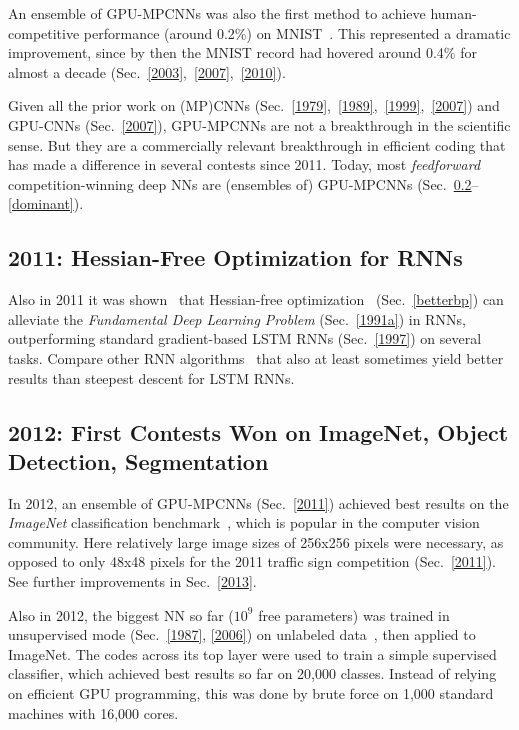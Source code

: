\documentclass[letterpaper]{article}
\begin{document}
\begin{CJK*}{UTF8}{gbsn}
An ensemble of GPU-MPCNNs was also the first method to achieve
human-competitive performance (around 0.2\%) on MNIST~\citep{ciresan2012cvpr}. 
This represented a dramatic improvement, since
by then the MNIST record had hovered around 0.4\% for almost a decade 
(Sec.~\ref{2003},~\ref{2007},~\ref{2010}). 

Given all the prior work on (MP)CNNs (Sec.~\ref{1979},~\ref{1989},~\ref{1999},~\ref{2007}) and GPU-CNNs (Sec.~\ref{2007}), 
GPU-MPCNNs are not a breakthrough in the scientific sense. 
But they are a commercially relevant breakthrough in efficient coding that has made a
difference in several contests since 2011. 
Today, most {\em feedforward} competition-winning deep NNs are (ensembles of) 
GPU-MPCNNs (Sec.~\ref{2012}--\ref{dominant}).

\subsection{2011: Hessian-Free Optimization for RNNs}
\label{2011rnn}

Also in 2011 it was shown~\citep{Martens:2011hessfree} that 
Hessian-free optimization~\citep[e.g.,][]{Moller:93,Pearlmutter:93,schraudolph02} (Sec.~\ref{betterbp})
can alleviate the 
{\em Fundamental Deep Learning Problem} (Sec.~\ref{1991a})
in RNNs, outperforming standard gradient-based 
LSTM RNNs (Sec.~\ref{1997}) on several tasks.
Compare other  RNN algorithms~\citep{Jaeger:04,Schmidhuber:07nc,pascanu2013,icml2014}
that also at least sometimes yield better results than steepest descent for LSTM RNNs.




\subsection{2012: First Contests Won on ImageNet, Object Detection, Segmentation}
\label{2012}

In 2012, an ensemble of GPU-MPCNNs (Sec.~\ref{2011}) 
achieved best results on the {\em ImageNet} classification benchmark~\citep{Krizhevsky:2012},
which is popular in the computer vision community.
Here relatively large image sizes of  256x256 pixels were necessary, 
as opposed to only 48x48 pixels for the 2011 traffic sign competition (Sec.~\ref{2011}).
See further improvements in Sec.~\ref{2013}.

Also in 2012, the biggest NN so far ($10^9$ free parameters) was trained
in unsupervised mode (Sec.~\ref{1987}, \ref{2006}) on unlabeled data~\citep{ng2012}, then applied to ImageNet. The codes across its top layer 
were used to train a simple supervised classifier,
which achieved best results so far on 20,000 classes.
Instead of relying on efficient GPU programming, this was done by brute force on 
1,000 standard machines with 16,000 cores.



\end{CJK*}
\end{document}
